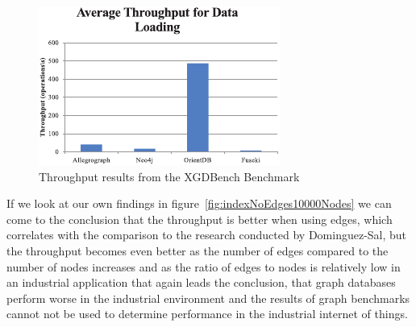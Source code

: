 \begin{figure}[!h]
  \centering
  \includegraphics[width=\textwidth]{images/benchmarks/XGDBenchResultsInsert}
  \caption{Throughput results from the XGDBench Benchmark\cite{Dayarathna2012}}
  \label{fig:throughputXGDBench}
\end{figure}

If we look at our own findings in figure~\ref{fig:indexNoEdges10000Nodes} we can come to the conclusion that the throughput is better when using edges,
which correlates with the comparison to the research conducted by Dominguez-Sal,
but the throughput becomes even better as the number of edges compared to the number of nodes increases and as the ratio of edges to nodes is relatively low in an industrial application that again leads the conclusion,
that graph databases perform worse in the industrial environment and the results of graph benchmarks cannot not be used to determine performance in the industrial internet of things.
